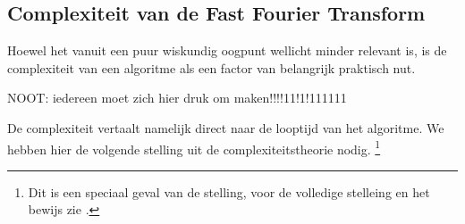 \subsection{Complexiteit van de Fast Fourier Transform}
Hoewel het vanuit een puur wiskundig oogpunt wellicht minder relevant is, is de complexiteit van een algoritme als een factor van belangrijk praktisch nut. 

NOOT: iedereen moet zich hier druk om maken!!!!11!1!111111

De complexiteit vertaalt namelijk direct naar 
de looptijd van het algoritme. We hebben hier de volgende stelling uit de complexiteitstheorie nodig.
\footnote{Dit is een speciaal geval van de stelling, voor de volledige stelleing en het bewijs zie \cite{akra-bazzi}.}

